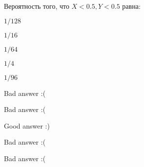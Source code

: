 
\begin{question}
Вероятность того, что \(X<0.5, Y<0.5\) равна:
\begin{answerlist}
  \item \(1/128\)
  \item \(1/16\)
  \item \(1/64\)
  \item \(1/4\)
  \item \(1/96\)
\end{answerlist}
\end{question}

\begin{solution}
\begin{answerlist}
  \item Bad answer :(
  \item Bad answer :(
  \item Good answer :)
  \item Bad answer :(
  \item Bad answer :(
\end{answerlist}
\end{solution}

